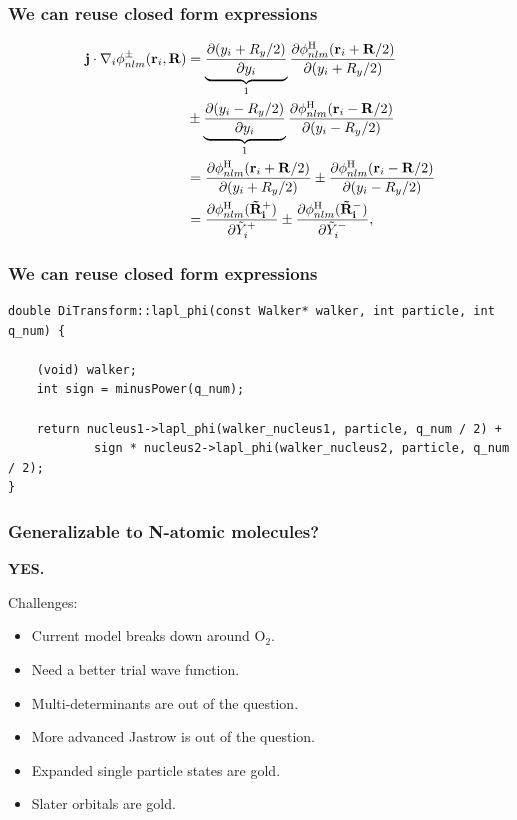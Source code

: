 \documentclass{beamer}
\begin{document}
\begin{frame}\frametitle{We can reuse closed form expressions}
 \begin{align}
 \mathbf{j}\cdot \nabla_i \phi_{nlm}^\pm (\mathbf{r}_i, \mathbf{R}) &= \underbrace{\frac{\partial (y_i + R_y/2)}{\partial y_i}}_{1}\frac{\partial \phi_{nlm}^\mathrm{H}(\mathbf{r}_i + \mathbf{R}/2)}{\partial (y_i + R_y/2)} \notag \\
  &\pm \underbrace{\frac{\partial (y_i - R_y/2)}{\partial y_i}}_{1}\frac{\partial \phi_{nlm}^\mathrm{H}(\mathbf{r}_i - \mathbf{R}/2)}{\partial (y_i - R_y/2)} \notag\\
  &= \frac{\partial \phi_{nlm}^\mathrm{H}(\mathbf{r}_i + \mathbf{R}/2)}{\partial (y_i + R_y/2)} \pm \frac{\partial \phi_{nlm}^\mathrm{H}(\mathbf{r}_i - \mathbf{R}/2)}{\partial (y_i - R_y/2)} \notag\\
  &=  \frac{\partial \phi_{nlm}^\mathrm{H}(\mathbf{\tilde R_i^+})}{\partial \tilde Y_i^+} \pm \frac{\partial \phi_{nlm}^\mathrm{H}(\mathbf{\tilde R_i^-})}{\partial \tilde Y_i^-}, \label{eq:MoleculeWorksWithOldFunctions} \notag
\end{align}
\end{frame}

\begin{frame}[containsverbatim]\frametitle{We can reuse closed form expressions}
\scriptsize
\begin{verbatim}
double DiTransform::lapl_phi(const Walker* walker, int particle, int q_num) {

    (void) walker;
    int sign = minusPower(q_num);

    return nucleus1->lapl_phi(walker_nucleus1, particle, q_num / 2) +
            sign * nucleus2->lapl_phi(walker_nucleus2, particle, q_num / 2);
}
\end{verbatim}
\normalsize
\end{frame}

\begin{frame}\frametitle{Generalizable to N-atomic molecules?}
 
 \textbf{YES.}\pause
 \vspace{0.5cm}
 
 Challenges:
 \begin{itemize}
  \item Current model breaks down around $\mathrm{O}_2$.
  \item Need a better trial wave function.
  \item Multi-determinants are out of the question.
  \item More advanced Jastrow is out of the question.
  \item Expanded single particle states are gold.
  \item Slater orbitals are gold.
 \end{itemize}

 
 
 
\end{frame}
\end{document}
